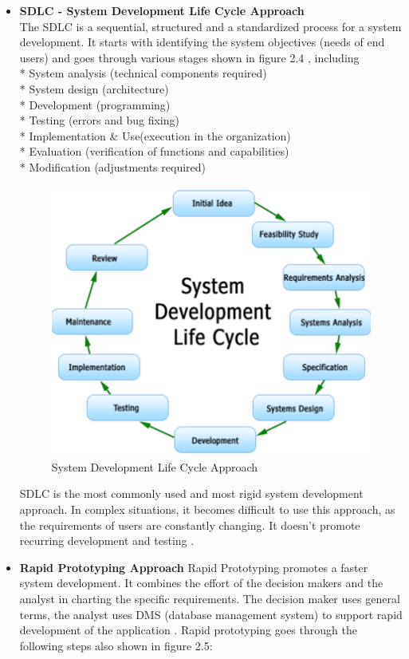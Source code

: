 \begin{itemize}
	\item \textbf{SDLC - System Development Life Cycle Approach}\\
	The SDLC is a sequential, structured and a standardized process for a system development. It starts with identifying the system objectives (needs of end users) and goes through various stages shown in figure 2.4 \cite{SDLC}, including \\
	* System analysis (technical components required)\\
	* System design (architecture)\\
	* Development (programming)\\
	* Testing (errors and bug fixing)\\
	* Implementation \& Use(execution in the organization)\\
	* Evaluation (verification of functions and capabilities)\\
	* Modification (adjustments required)\\
\begin{figure}[H]
\centering
\includegraphics[scale=0.5]{Images/SLDC.png}
\caption[System Development Life Cycle Approach]{System Development Life Cycle Approach \cite{SDLC}}
\end{figure}
SDLC is the most commonly used and most rigid system development approach. In complex situations, it becomes difficult to use this approach, as the requirements of users are constantly changing. It doesn’t promote recurring development and testing \cite{DSS}.
	\item \textbf{Rapid Prototyping Approach}
Rapid Prototyping promotes a faster system development. It combines the effort of the decision makers and the analyst in charting the specific requirements. The decision maker uses general terms, the analyst uses DMS (database management system) to support rapid development of the application \cite{DSS}. Rapid prototyping goes through the following steps also shown in figure 2.5:\\

\end{itemize}
